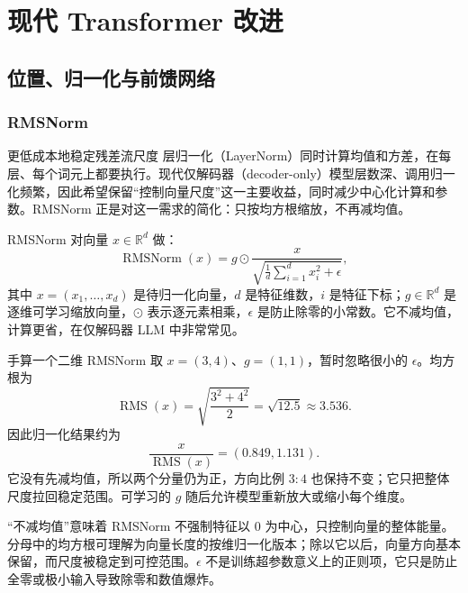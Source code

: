 \part{现代 Transformer 改进}

\chapter{位置、归一化与前馈网络}

\section{RMSNorm}
\label{sec:normalization}

\begin{motivationbox}{更低成本地稳定残差流尺度}
层归一化（LayerNorm）同时计算均值和方差，在每层、每个词元上都要执行。现代仅解码器（decoder-only）模型层数深、调用归一化频繁，因此希望保留“控制向量尺度”这一主要收益，同时减少中心化计算和参数。RMSNorm 正是对这一需求的简化：只按均方根缩放，不再减均值。
\end{motivationbox}

RMSNorm 对向量 $x\in\mathbb R^d$ 做：
\[
\operatorname{RMSNorm}(x)=g\odot\frac{x}{\sqrt{\frac{1}{d}\sum_{i=1}^d x_i^2+\epsilon}},
\]
其中 $x=(x_1,\ldots,x_d)$ 是待归一化向量，$d$ 是特征维数，$i$ 是特征下标；$g\in\mathbb R^d$ 是逐维可学习缩放向量，$\odot$ 表示逐元素相乘，$\epsilon$ 是防止除零的小常数。它不减均值，计算更省，在仅解码器 LLM 中非常常见。

\begin{examplebox}{手算一个二维 RMSNorm}
取 $x=(3,4)$、$g=(1,1)$，暂时忽略很小的 $\epsilon$。均方根为
\[
\operatorname{RMS}(x)=\sqrt{\frac{3^2+4^2}{2}}
=\sqrt{12.5}\approx3.536.
\]
因此归一化结果约为
\[
\frac{x}{\operatorname{RMS}(x)}=(0.849,1.131).
\]
它没有先减均值，所以两个分量仍为正，方向比例 $3:4$ 也保持不变；它只把整体尺度拉回稳定范围。可学习的 $g$ 随后允许模型重新放大或缩小每个维度。
\end{examplebox}

“不减均值”意味着 RMSNorm 不强制特征以 $0$ 为中心，只控制向量的整体能量。分母中的均方根可理解为向量长度的按维归一化版本；除以它以后，向量方向基本保留，而尺度被稳定到可控范围。$\epsilon$ 不是训练超参数意义上的正则项，它只是防止全零或极小输入导致除零和数值爆炸。


